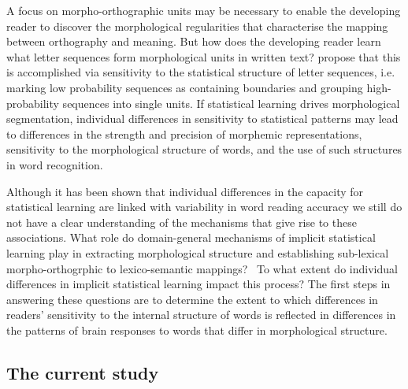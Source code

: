 \documentclass[review]{elsarticle}
\begin{document}
A focus on morpho-orthographic units may be necessary to enable the developing reader to discover the morphological regularities that characterise the mapping between orthography and meaning.  But how does the developing reader learn what letter sequences form morphological units in written text?  {\renewcommand\&{and}\citet{rastleMorphologicalDecompositionBased2008}} propose that this is accomplished via sensitivity to the statistical structure of letter sequences, i.e. marking low probability sequences as containing boundaries and  grouping high- probability sequences into single units. If statistical learning drives morphological segmentation, individual differences in sensitivity to statistical patterns may lead to differences in the strength and precision of morphemic representations,  sensitivity to the morphological structure of words,  and the use of such structures in word recognition. 

Although it has been shown that individual differences in the capacity for statistical learning are linked with variability in word reading accuracy \citep{arciuliReadingStatisticalLearning2018, arciuliStatisticalLearningRelated2012} we still do not have a clear understanding of the mechanisms that give rise to these associations. What role do domain-general mechanisms of implicit statistical learning play in extracting morphological structure and establishing sub-lexical morpho-orthogrphic to lexico-semantic mappings?  To what extent do individual differences in implicit statistical learning impact this process? The first steps in answering these questions are to determine the extent to which differences in readers’ sensitivity to the internal structure of words is reflected in differences in the patterns of brain responses to words that differ in morphological structure. 

\subsection{The current study}









\end{document}
